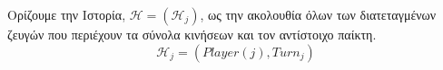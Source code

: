 {}
\begin{definition}[Ιστορία]
  Ορίζουμε την Ιστορία, $\mathcal{H} = \left(\mathcal{H}_j\right)$, ως την ακολουθία όλων των διατεταγμένων ζευγών που
  περιέχουν τα σύνολα κινήσεων και τον αντίστοιχο παίκτη.
  \begin{equation}
    \mathcal{H}_j = \left(Player\left(j\right), Turn_j\right)
  \end{equation}
\end{definition}
